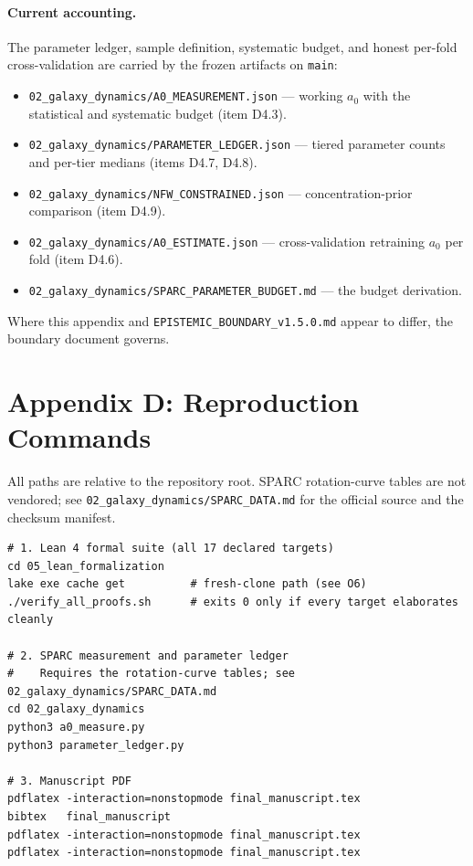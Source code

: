 \paragraph{Current accounting.}
The parameter ledger, sample definition, systematic budget, and honest per-fold
cross-validation are carried by the frozen artifacts on \texttt{main}:

\begin{itemize}\raggedright
  \item \texttt{02\_galaxy\_dynamics/A0\_MEASUREMENT.json} --- working $a_0$ with the
        statistical and systematic budget (item D4.3).
  \item \texttt{02\_galaxy\_dynamics/PARAMETER\_LEDGER.json} --- tiered parameter counts and
        per-tier medians (items D4.7, D4.8).
  \item \texttt{02\_galaxy\_dynamics/NFW\_CONSTRAINED.json} --- concentration-prior comparison
        (item D4.9).
  \item \texttt{02\_galaxy\_dynamics/A0\_ESTIMATE.json} --- cross-validation retraining $a_0$
        per fold (item D4.6).
  \item \texttt{02\_galaxy\_dynamics/SPARC\_PARAMETER\_BUDGET.md} --- the budget derivation.
\end{itemize}

Where this appendix and \texttt{EPISTEMIC\_BOUNDARY\_v1.5.0.md} appear to differ, the boundary
document governs.

\section*{Appendix D: Reproduction Commands}
\label{app:reproduction_commands}

All paths are relative to the repository root. SPARC rotation-curve tables are not vendored;
see \texttt{02\_galaxy\_dynamics/SPARC\_DATA.md} for the official source and the checksum
manifest.

\begin{verbatim}
# 1. Lean 4 formal suite (all 17 declared targets)
cd 05_lean_formalization
lake exe cache get          # fresh-clone path (see O6)
./verify_all_proofs.sh      # exits 0 only if every target elaborates cleanly

# 2. SPARC measurement and parameter ledger
#    Requires the rotation-curve tables; see 02_galaxy_dynamics/SPARC_DATA.md
cd 02_galaxy_dynamics
python3 a0_measure.py
python3 parameter_ledger.py

# 3. Manuscript PDF
pdflatex -interaction=nonstopmode final_manuscript.tex
bibtex   final_manuscript
pdflatex -interaction=nonstopmode final_manuscript.tex
pdflatex -interaction=nonstopmode final_manuscript.tex
\end{verbatim}

